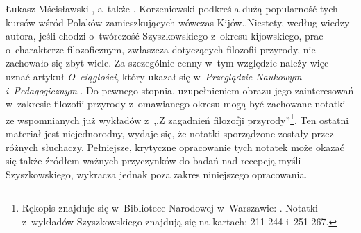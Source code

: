 \begin{artplenv}{Łukasz Mścisławski}
{%
\parencite[][]{kaminski_wyzsze_1917}, %
 a~także 
\parencite[][s.~229-236]{korzeniowski_za_2009}. %
Korzeniowski podkreśla dużą popularność tych kursów wśród Polaków zamieszkujących wówczas Kijów.}.Niestety, według wiedzy autora, jeśli chodzi o~twórczość Szyszkowskiego z~okresu kijowskiego, prac o~charakterze filozoficznym, zwłaszcza dotyczących filozofii przyrody, nie zachowało się zbyt wiele. Za szczególnie cenny w~tym względzie należy więc uznać artykuł \textit{O~ciągłości}, który ukazał się w~\textit{Przeglądzie Naukowym i~Pedagogicznym} 
\parencite[][]{szyszkowski_o_1916}. %
 Do pewnego stopnia, uzupełnieniem obrazu jego zainteresowań w~zakresie filozofii przyrody z~omawianego okresu mogą być zachowane notatki ze wspomnianych już wykładów z~,,Z zagadnień filozofji przyrody''\footnote{Rękopis znajduje się w~Bibliotece Narodowej w~Warszawie: 
\parencite*[][]{noauthor_noty_1917}. %
 Notatki z~wykładów Szyszkowskiego znajdują się na kartach: 211-244 i~251-267.}. Ten ostatni materiał jest niejednorodny, wydaje się, że notatki sporządzone zostały przez różnych słuchaczy. Pełniejsze, krytyczne opracowanie tych notatek może okazać się także źródłem ważnych przyczynków do badań nad recepcją myśli Szyszkowskiego, wykracza jednak poza zakres niniejszego opracowania.


\end{artplenv}
